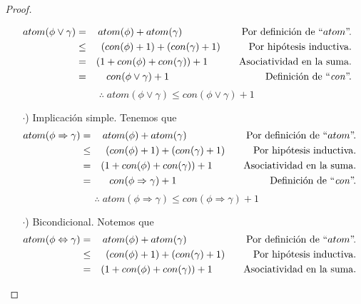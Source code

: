\documentclass{article}
\begin{document}
\begin{enumerate}
\begin{itemize}
\begin{proof}
\begin{itemize}
\begin{eqnarray*}
        atom(\phi \lor \gamma) &=& atom(\phi) + atom(\gamma)
        \hspace*{2.1cm} \text{Por definición de ``$atom$''.}\\
        &\leq& (con(\phi) + 1) + (con(\gamma) + 1)
        \hspace*{1cm} \text{Por hipótesis inductiva.}\\
        &=& (1 + con(\phi) + con(\gamma)) + 1
        \hspace*{1.1cm} \text{Asociatividad en la suma.}\\
        &=& con(\phi \lor \gamma) + 1
        \hspace*{3.4cm} \text{Definición de ``\textit{con}''.}
      \end{eqnarray*}
      \[
      \therefore \; atom(\phi \lor \gamma) \leq con(\phi \lor \gamma) + 1
      \]
    \item[$\cdot$)] Implicación simple. Tenemos que
      \begin{eqnarray*}
        atom(\phi \Rightarrow \gamma) &=& atom(\phi) + atom(\gamma)
        \hspace*{2.1cm} \text{Por definición de ``$atom$''.}\\
        &\leq& (con(\phi) + 1) + (con(\gamma) + 1)
        \hspace*{1cm} \text{Por hipótesis inductiva.}\\
        &=& (1 + con(\phi) + con(\gamma)) + 1
        \hspace*{1.1cm} \text{Asociatividad en la suma.}\\
        &=& con(\phi \Rightarrow \gamma) + 1
        \hspace*{3.3cm} \text{Definición de ``\textit{con}''.}
      \end{eqnarray*}
      \[
      \therefore \; atom(\phi \Rightarrow \gamma) \leq con(\phi \Rightarrow \gamma) + 1
      \]
    \item[$\cdot$)] Bicondicional. Notemos que
      \begin{eqnarray*}
        atom(\phi \Leftrightarrow \gamma) &=& atom(\phi) + atom(\gamma)
        \hspace*{2.1cm} \text{Por definición de ``$atom$''.}\\
        &\leq& (con(\phi) + 1) + (con(\gamma) + 1)
        \hspace*{1cm} \text{Por hipótesis inductiva.}\\
        &=& (1 + con(\phi) + con(\gamma)) + 1
        \hspace*{1.1cm} \text{Asociatividad en la suma.}\\

\end{eqnarray*}
\end{itemize}
\end{proof}
\end{itemize}
\end{enumerate}
\end{document}
